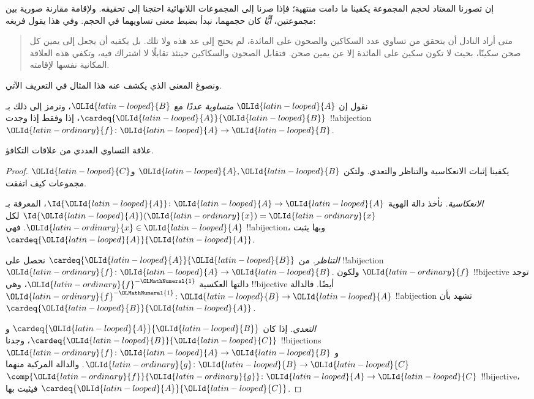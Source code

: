\documentclass[../../../include/open-logic-section]{subfiles}
\begin{document}


إن تصورنا المعتاد لحجم المجموعة يكفينا ما دامت منتهية؛ فإذا صرنا إلى المجموعات اللانهائية احتجنا إلى تحقيقه. ولإقامة مقارنة صورية بين مجموعتين، \emph{أيًّا} كان حجمهما، نبدأ بضبط معنى تساويهما في الحجم. وفي هذا يقول فريغه:
\begin{quote}
متى أراد النادل أن يتحقق من تساوي عدد السكاكين والصحون على المائدة، لم يحتج إلى عد هذه ولا تلك. بل يكفيه أن يجعل إلى يمين كل صحن سكينًا، بحيث لا تكون سكين على المائدة إلا عن يمين صحن. فتقابل الصحون والسكاكين حينئذ تقابلًا لا اشتراك فيه، وتكفي هذه العلاقة المكانية نفسها لإقامته. \citep[\S70]{Frege1884}
\end{quote}
ونصوغ المعنى الذي يكشف عنه هذا المثال في التعريف الآتي.

\begin{defn}
نقول إن $\OLId{latin-looped}{A}$ \emph{متساوية عددًا} مع $\OLId{latin-looped}{B}$، ونرمز إلى ذلك بـ$\cardeq{\OLId{latin-looped}{A}}{\OLId{latin-looped}{B}}$، إذا وفقط إذا وجدت !!a{bijection} $\OLId{latin-ordinary}{f} \colon \OLId{latin-looped}{A} \to \OLId{latin-looped}{B}$.
\end{defn}

\begin{prop}
علاقة التساوي العددي من علاقات التكافؤ.
\end{prop}

\begin{proof}
يكفينا إثبات الانعكاسية والتناظر والتعدي. ولتكن $\OLId{latin-looped}{A}, \OLId{latin-looped}{B}$ و$\OLId{latin-looped}{C}$ مجموعات كيف اتفقت.

\emph{الانعكاسية.} نأخذ دالة الهوية $\Id{\OLId{latin-looped}{A}} \colon \OLId{latin-looped}{A} \to \OLId{latin-looped}{A}$، المعرفة بـ$\Id{\OLId{latin-looped}{A}} (\OLId{latin-ordinary}{x}) = \OLId{latin-ordinary}{x}$ لكل $\OLId{latin-ordinary}{x} \in \OLId{latin-looped}{A}$. فهي !!a{bijection}، وبها يثبت $\cardeq{\OLId{latin-looped}{A}}{\OLId{latin-looped}{A}}$.

\emph{التناظر.} من $\cardeq{\OLId{latin-looped}{A}}{\OLId{latin-looped}{B}}$ نحصل على !!a{bijection} $\OLId{latin-ordinary}{f}\colon \OLId{latin-looped}{A} \to \OLId{latin-looped}{B}$. ولكون $\OLId{latin-ordinary}{f}$ !!{bijective} توجد دالتها العكسية $\OLId{latin-ordinary}{f}^{-\OLMathNumeral{1}}$، وهي !!{bijective} أيضًا. فالدالة $\OLId{latin-ordinary}{f}^{-\OLMathNumeral{1}}\colon \OLId{latin-looped}{B} \to \OLId{latin-looped}{A}$ !!a{bijection} تشهد بأن $\cardeq{\OLId{latin-looped}{B}}{\OLId{latin-looped}{A}}$.

\emph{التعدي.} إذا كان $\cardeq{\OLId{latin-looped}{A}}{\OLId{latin-looped}{B}}$ و$\cardeq{\OLId{latin-looped}{B}}{\OLId{latin-looped}{C}}$، وجدنا !!{bijection}s $\OLId{latin-ordinary}{f}\colon \OLId{latin-looped}{A} \to \OLId{latin-looped}{B}$ و$\OLId{latin-ordinary}{g}\colon \OLId{latin-looped}{B} \to
\OLId{latin-looped}{C}$. والدالة المركبة منهما $\comp{\OLId{latin-ordinary}{f}}{\OLId{latin-ordinary}{g}}\colon \OLId{latin-looped}{A} \to \OLId{latin-looped}{C}$ !!{bijective}، فيثبت بها $\cardeq{\OLId{latin-looped}{A}}{\OLId{latin-looped}{C}}$.
\end{proof}
\end{document}
